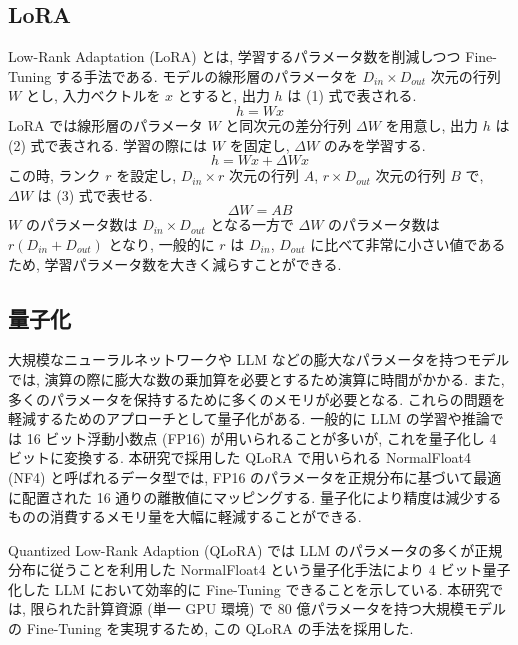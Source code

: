 \documentclass{jarticle}
\begin{document}
\vspace{-3mm}
\subsection{LoRA}
\vspace{-1mm}

Low-Rank Adaptation (LoRA) \cite{LoRA} とは, 学習するパラメータ数を削減しつつ Fine-Tuning する手法である. モデルの線形層のパラメータを $D_{in} \times D_{out}$ 次元の行列 $W$ とし, 入力ベクトルを $x$ とすると, 出力 $h$ は (1) 式で表される.
\begin{equation}
    h = Wx
\end{equation}
LoRA では線形層のパラメータ $W$ と同次元の差分行列 $\Delta W$ を用意し, 出力 $h$ は (2) 式で表される. 学習の際には $W$ を固定し, $\Delta W$ のみを学習する.
\begin{equation}
    h = Wx + \Delta Wx
\end{equation}
この時, ランク $r$ を設定し, $D_{in} \times r$ 次元の行列 $A$, $r \times D_{out}$ 次元の行列 $B$ で, $\Delta W$ は (3) 式で表せる.
\begin{equation}
    \Delta W = AB
\end{equation}
$W$ のパラメータ数は $D_{in} \times D_{out}$ となる一方で $\Delta W$ のパラメータ数は $r(D_{in} + D_{out})$ となり, 一般的に $r$ は $D_{in}$, $D_{out}$ に比べて非常に小さい値であるため, 学習パラメータ数を大きく減らすことができる.

\vspace{-3mm}
\subsection{量子化}
\vspace{-1mm}

大規模なニューラルネットワークや LLM などの膨大なパラメータを持つモデルでは, 演算の際に膨大な数の乗加算を必要とするため演算に時間がかかる. また, 多くのパラメータを保持するために多くのメモリが必要となる. これらの問題を軽減するためのアプローチとして量子化がある. 一般的に LLM の学習や推論では 16 ビット浮動小数点 (FP16) が用いられることが多いが, これを量子化し 4 ビットに変換する. 本研究で採用した QLoRA で用いられる NormalFloat4 (NF4) と呼ばれるデータ型では, FP16 のパラメータを正規分布に基づいて最適に配置された 16 通りの離散値にマッピングする. 量子化により精度は減少するものの消費するメモリ量を大幅に軽減することができる. \par
Quantized Low-Rank Adaption (QLoRA) \cite{QLoRA} では LLM のパラメータの多くが正規分布に従うことを利用した NormalFloat4 という量子化手法により 4 ビット量子化した LLM において効率的に Fine-Tuning できることを示している. 本研究では, 限られた計算資源 (単一 GPU 環境) で 80 億パラメータを持つ大規模モデルの Fine-Tuning を実現するため, この QLoRA の手法を採用した.
\end{document}
